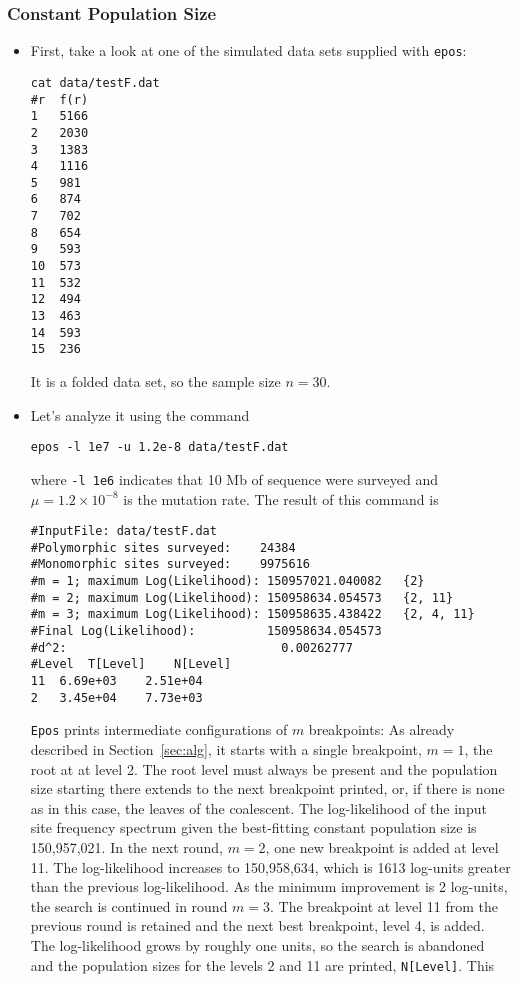 \documentclass[a4paper, english]{article}
\newcommand{\ty}{\texttt}
\begin{document}
\subsubsection{Constant Population Size}
\begin{itemize}
\item First, take a look at one of the simulated data sets supplied
  with \ty{epos}:
\begin{verbatim}
cat data/testF.dat 
#r	f(r)
1	5166
2	2030
3	1383
4	1116
5	981
6	874
7	702
8	654
9	593
10	573
11	532
12	494
13	463
14	593
15	236
\end{verbatim}
It is a folded data set, so the sample size $n=30$.
\item Let's analyze it using the command
\begin{verbatim}
epos -l 1e7 -u 1.2e-8 data/testF.dat 
\end{verbatim}
where \ty{-l 1e6} indicates that 10 Mb of sequence were surveyed and
$\mu=1.2\times 10^{-8}$ is the mutation rate. The result of this command is
\begin{verbatim}
#InputFile:	data/testF.dat
#Polymorphic sites surveyed:	24384
#Monomorphic sites surveyed:	9975616
#m = 1; maximum Log(Likelihood): 150957021.040082	{2}
#m = 2; maximum Log(Likelihood): 150958634.054573	{2, 11}
#m = 3; maximum Log(Likelihood): 150958635.438422	{2, 4, 11}
#Final Log(Likelihood):          150958634.054573
#d^2:                              0.00262777
#Level	T[Level]	N[Level]
11	6.69e+03	2.51e+04
2	3.45e+04	7.73e+03
\end{verbatim}
\ty{Epos} prints intermediate configurations of $m$ breakpoints: As
already described in Section~\ref{sec:alg}, it starts with a single
breakpoint, $m=1$, the root at at level 2. The root level must always
be present and the population size starting there extends to the next
breakpoint printed, or, if there is none as in this case, the leaves
of the coalescent. The log-likelihood of the input site frequency
spectrum given the best-fitting constant population size is
150,957,021. In the next round, $m=2$, one new breakpoint is added at
level 11. The log-likelihood increases to 150,958,634, which is 
1613 log-units greater than the previous log-likelihood. As the minimum
improvement is 2 log-units, the search is continued in round
$m=3$. The breakpoint at level 11 from the previous round is retained
and the next best breakpoint, level 4, is added. The log-likelihood
grows by roughly one units, so the search is abandoned and the
population sizes for the levels 2 and 11 are printed, \ty{N[Level]}. This

\end{itemize}
\end{document}
